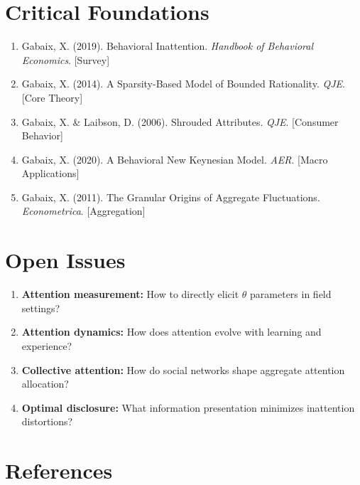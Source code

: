 \section{Critical Foundations}

\begin{enumerate}
    \item Gabaix, X. (2019). Behavioral Inattention. \textit{Handbook of Behavioral Economics}. [Survey]
    \item Gabaix, X. (2014). A Sparsity-Based Model of Bounded Rationality. \textit{QJE}. [Core Theory]
    \item Gabaix, X. \& Laibson, D. (2006). Shrouded Attributes. \textit{QJE}. [Consumer Behavior]
    \item Gabaix, X. (2020). A Behavioral New Keynesian Model. \textit{AER}. [Macro Applications]
    \item Gabaix, X. (2011). The Granular Origins of Aggregate Fluctuations. \textit{Econometrica}. [Aggregation]
\end{enumerate}

\section{Open Issues}

\begin{enumerate}
    \item \textbf{Attention measurement:} How to directly elicit $\theta$ parameters in field settings?
    \item \textbf{Attention dynamics:} How does attention evolve with learning and experience?
    \item \textbf{Collective attention:} How do social networks shape aggregate attention allocation?
    \item \textbf{Optimal disclosure:} What information presentation minimizes inattention distortions?
\end{enumerate}

\section{References}

